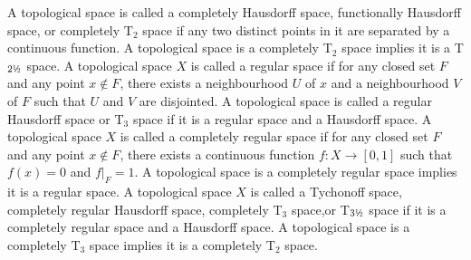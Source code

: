 \documentclass[a4paper,12pt]{article}
\begin{document}
A topological space is called a completely Hausdorff space, functionally Hausdorff space, or completely T$_2$ space if any two distinct points in it are separated by a continuous function. A topological space is a completely T$_2$ space implies it is a T\(_{2\text{\textonehalf}}\) space.
A topological space $X$ is called a regular space if for any closed set $F$ and any point $x\notin F$, there exists a neighbourhood $U$ of $x$ and a neighbourhood $V$ of $F$ such that $U$ and $V$ are disjointed.
A topological space is called a regular Hausdorff space or T$_3$ space if it is a regular space and a Hausdorff space.
A topological space $X$ is called a completely regular space if for any closed set $F$ and any point $x\notin F$, there exists a continuous function $f\colon X\to [0,1]$ such that $f(x)=0$ and $f\vert_F=1$. A topological space is a completely regular space implies it is a regular space.
A topological space $X$ is called a Tychonoff space, completely regular Hausdorff space, completely T$_3$ space,or T\(_{3\text{\textonehalf}}\) space if it is a completely regular space and a Hausdorff space. A topological space is a completely T$_3$ space implies it is a completely T$_2$ space.
\end{document}
